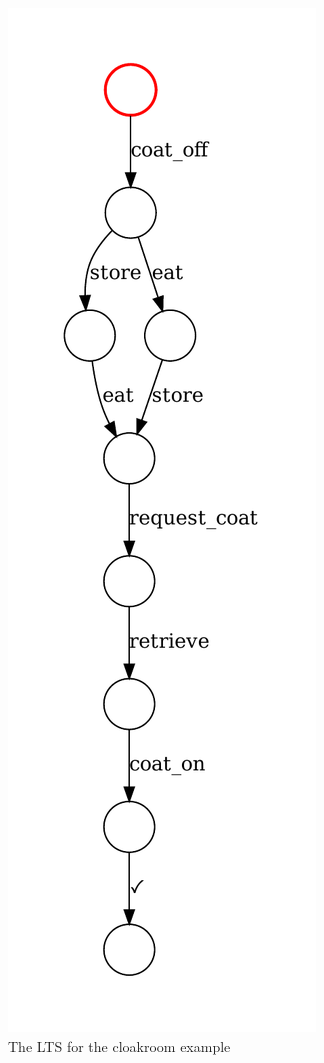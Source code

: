 \begin{figure}[htb]
	\caption[The LTS for the cloakroom example]{The LTS for the cloakroom example}
	\label{lts-example}
	\begin{center}
		\includegraphics[scale=0.5]{images/LTS.pdf}
	\end{center}
\end{figure}

